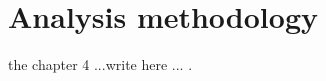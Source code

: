 \chapter{Analysis methodology}\label{chp:analysis}

\noindent
\hspace{0.635cm}the chapter 4 ...write here ...
\cite{Pasechnik:2016wkt}.